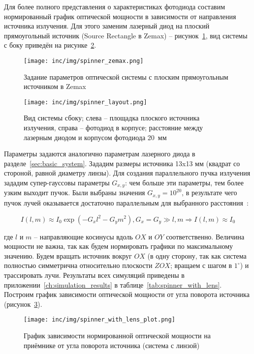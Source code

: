 Для более полного представления о характеристиках фотодиода составим нормированный график оптической мощности в зависимости от направления источника излучения. Для этого заменим лазерный диод на плоский прямоугольный источник (Source Rectangle в Zemax) \--- рисунок~\ref{fig:spinner_zemax}, вид системы с боку приведён на рисунке~\ref{fig:spinner_layout}. 

\begin{figure}[h]
    \centering
    \texttt{[image: inc/img/spinner\_zemax.png]}
    \caption{Задание параметров оптической системы с плоским прямоугольным источником в Zemax}
    \label{fig:spinner_zemax}
\end{figure}

\begin{figure}[!h]
    \centering
    \texttt{[image: inc/img/spinner\_layout.png]}
    \caption{Вид системы сбоку; слева \--- площадка плоского источника излучения, справа \--- фотодиод в корпусе; расстояние между лазерным диодом и корпусом фотодиода 20~мм}
    \label{fig:spinner_layout}
\end{figure}

Параметры задаются аналогично параметрам лазерного диода в разделе~\ref{sec:basic_system}. Зададим размеры источника 13x13 мм (квадрат со стороной, равной диаметру линзы). Для создания параллельного пучка излучения зададим супер-гауссовы параметры $G_{x,y}$: чем больше эти параметры, тем более узким выходит пучок. Были выбраны значения $G_{x,y} = 10^{20}$, в результате чего пучок лучей оказывается достаточно параллельным для выбранного расстояния~\cite{Zemax2021}:

\begin{equation}
    I(l, m) \approx I_{0} \exp{\left(-G_{x} l^{2}-G_{y} m^{2}\right)},  G_{x} = G_y \gg l,m \Rightarrow I(l, m) \approx I_0
\end{equation}

где $l$ и $m$ \--- направляющие косинусы вдоль $OX$ и $OY$ соответственно. Величина мощности не важна, так как будем нормировать графики по максимальному значению. Будем вращать источник вокруг $OX$ (в одну сторону, так как система полностью симметрична относительно плоскости $ZOX$; вращаем с шагом в $1^\circ$) и трассировать лучи. Результаты всех симуляций приведены в приложении~\ref{ch:simulation_results} в таблице~\ref{tab:spinner_with_lens}. Построим график зависимости оптической мощности от угла поворота источника (рисунок~\ref{fig:spinner_with_lens_plot}).

\begin{figure}[!h]
    \centering
    \texttt{[image: inc/img/spinner\_with\_lens\_plot.png]}
    \caption{График зависимости нормированной оптической мощности на приёмнике от угла поворота источника (система с линзой)}
    \label{fig:spinner_with_lens_plot}
\end{figure}

